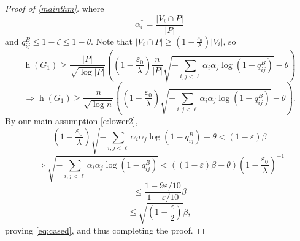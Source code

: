 \documentclass{article}
\newcommand{\eps}{\varepsilon}
\newcommand{\s}[1]{\left(#1\right)}
\DeclareMathOperator{\had}{h}
\begin{document}
\begin{proof}[Proof of \cref{mainthm}]
where
$$\alpha^*_i = \frac{|V_i \cap P|}{|P|}$$
and $q_{ij}^B \leq 1 - \zeta \leq 1 - \theta$. Note that $|V_i \cap P| \geq (1-\frac{\eps_0}\lambda) |V_i|$, so
$$\had(G_1) \geq \frac{|P|}{\sqrt{\log |P|}} \s{\s{1 - \frac{\eps_0}{\lambda}} \frac{n}{|P|} \sqrt{-\sum_{i, j < \ell} \alpha_i \alpha_j \log\s{1-q^B_{ij}}} - \theta}$$
$$\Rightarrow \had(G_1) \geq \frac{n}{\sqrt{\log n}} \s{\s{1 - \frac{\eps_0}{\lambda}} \sqrt{-\sum_{i, j < \ell} \alpha_i \alpha_j \log\s{1-q^B_{ij}}} - \theta}.$$
By our main assumption \eqref{e:lower2},
$$\s{1-\frac{\eps_0}\lambda} \sqrt{-\sum_{i, j < \ell} \alpha_i \alpha_j \log(1-q_{ij}^B)} - \theta < (1-\eps) \beta$$
$$\Rightarrow \sqrt{-\sum_{i, j < \ell} \alpha_i \alpha_j \log(1-q_{ij}^B)} < \s{(1-\eps)\beta + \theta}\s{1 - \frac{\eps_0}\lambda}^{-1}$$
$$\leq \frac{1-9\eps/10}{1-\eps/10} \beta$$
$$\leq \sqrt{\s{1-\frac\eps2}}\beta,$$
proving \eqref{eq:cased}, and thus completing the proof.





\end{proof}
\end{document}
